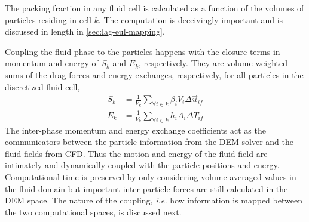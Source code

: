 The packing fraction in any fluid cell is calculated as a function of the volumes of particles residing in cell $k$. The computation is deceivingly important and is discussed in length in \cref{sec:lag-eul-mapping}.

Coupling the fluid phase to the particles happens with the closure terms in momentum and energy of $S_k$ and $E_k$, respectively. They are volume-weighted sums of the drag forces and energy exchanges, respectively, for all particles in the discretized fluid cell,
\begin{subequations}\label{eq:cfd-sources}
\begin{align}
	S_k &= \frac{1}{V_k}\sum_{\forall i \in k} \beta_i V_i \Delta \vec{u}_{if} \label{eq:cfd-mom-source}\\
	E_k &= \frac{1}{V_k}\sum_{\forall i \in k} h_i A_i \Delta T_{if}
\end{align}
\end{subequations}
The inter-phase momentum and energy exchange coefficients act as the communicators between the particle information from the DEM solver and the fluid fields from CFD. Thus the motion and energy of the fluid field are intimately and dynamically coupled with the particle positions and energy. Computational time is preserved by only considering volume-averaged values in the fluid domain but important inter-particle forces are still calculated in the DEM space. The nature of the coupling, \textit{i.e.} how information is mapped between the two computational spaces, is discussed next.%





